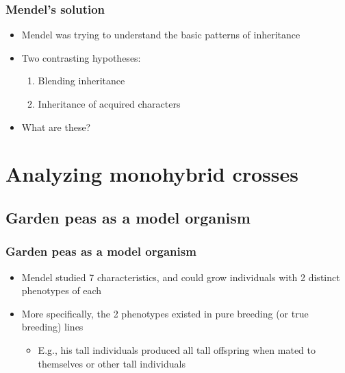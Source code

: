 \begin{frame}
    \frametitle{Mendel's solution}

    \begin{itemize}
        \item<1-> Mendel was trying to understand the basic patterns of inheritance

        \item<2-> Two contrasting hypotheses:
            \begin{enumerate}
                \item<2-> Blending inheritance

                \item<2-> Inheritance of acquired characters
            \end{enumerate}

        \item<2-> What are these?
    \end{itemize}
\end{frame}

\section{Analyzing monohybrid crosses}

\subsection{Garden peas as a model organism}

\begin{frame}
    \frametitle{Garden peas as a model organism}

    \begin{itemize}
        \item<1-> Mendel studied 7 characteristics, and could grow individuals with
            2 distinct phenotypes of each

        \item<2-> More specifically, the 2 phenotypes existed in pure breeding (or
            true breeding) lines
            \begin{itemize}
                \item<2-> E.g., his tall individuals produced all tall offspring
                    when mated to themselves or other tall individuals
            \end{itemize}
    \end{itemize}
\end{frame}

